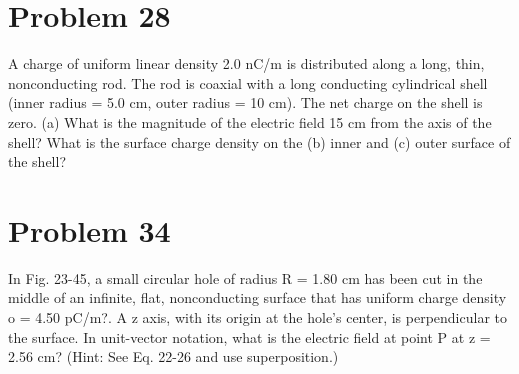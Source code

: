 \documentclass[12pt]{article}
\begin{document}
\section{Problem 28}
A charge of uniform linear density 2.0 nC/m is distributed along a long, thin, nonconducting rod.
The rod is coaxial with a long conducting cylindrical shell (inner radius = 5.0 cm, outer radius = 10 cm). The
net charge on the shell is zero. (a) What is the magnitude of the electric field 15 cm from the axis of the shell?
What is the surface charge density on the (b) inner and (c) outer surface of the shell?

\section{Problem 34}
In Fig. 23-45, a small circular hole of radius R = 1.80 cm has been cut in the middle of an infinite, flat,
nonconducting surface that has uniform charge density o = 4.50 pC/m?. A z axis, with its origin at the hole's
center, is perpendicular to the surface. In unit-vector notation, what is the electric field at point P at z = 2.56
cm? (Hint: See Eq. 22-26 and use superposition.)
\end{document}
